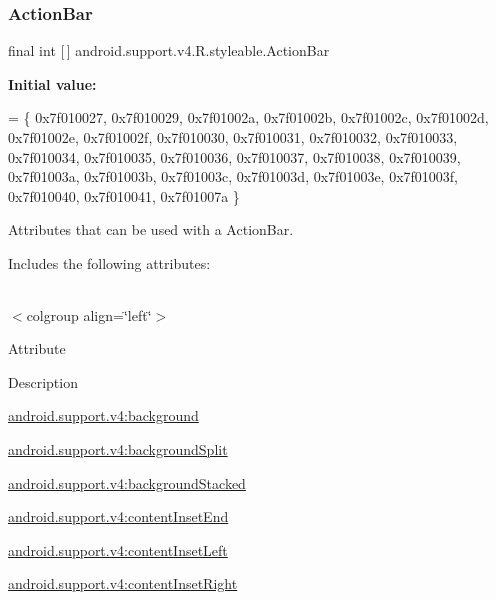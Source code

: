 \subsubsection{\texorpdfstring{Action\+Bar}{ActionBar}}
{\footnotesize\ttfamily final int \mbox{[}$\,$\mbox{]} android.\+support.\+v4.\+R.\+styleable.\+Action\+Bar\hspace{0.3cm}{\ttfamily [static]}}

{\bfseries Initial value\+:}
\begin{DoxyCode}
= \{
            0x7f010027, 0x7f010029, 0x7f01002a, 0x7f01002b,
            0x7f01002c, 0x7f01002d, 0x7f01002e, 0x7f01002f,
            0x7f010030, 0x7f010031, 0x7f010032, 0x7f010033,
            0x7f010034, 0x7f010035, 0x7f010036, 0x7f010037,
            0x7f010038, 0x7f010039, 0x7f01003a, 0x7f01003b,
            0x7f01003c, 0x7f01003d, 0x7f01003e, 0x7f01003f,
            0x7f010040, 0x7f010041, 0x7f01007a
        \}
\end{DoxyCode}
Attributes that can be used with a Action\+Bar. 

Includes the following attributes\+:

\tabulinesep=1mm
\begin{longtabu} spread 0pt [c]{*{0}{|X[-1]}|}
\hline
\end{longtabu}
$<$colgroup align=\char`\"{}left\char`\"{}$>$ 

Attribute

Description 

{\ttfamily \hyperlink{classandroid_1_1support_1_1v4_1_1R_1_1styleable_a94adf52e3aef74eee3f46cc8699d6d08}{android.\+support.\+v4\+:background}}

{\ttfamily \hyperlink{classandroid_1_1support_1_1v4_1_1R_1_1styleable_a13fc4682aff98cabdb455b8d50537f59}{android.\+support.\+v4\+:background\+Split}}

{\ttfamily \hyperlink{classandroid_1_1support_1_1v4_1_1R_1_1styleable_aacf7d90f6edcba30a3c2043eec5cef02}{android.\+support.\+v4\+:background\+Stacked}}

{\ttfamily \hyperlink{classandroid_1_1support_1_1v4_1_1R_1_1styleable_a8c18998b9778b47903b01c995bc228dd}{android.\+support.\+v4\+:content\+Inset\+End}}

{\ttfamily \hyperlink{classandroid_1_1support_1_1v4_1_1R_1_1styleable_acb50a5936c9ea41ae3f8e43860a37a11}{android.\+support.\+v4\+:content\+Inset\+Left}}

{\ttfamily \hyperlink{classandroid_1_1support_1_1v4_1_1R_1_1styleable_a3bef2a0708d9a976e79efa23e5327187}{android.\+support.\+v4\+:content\+Inset\+Right}}

